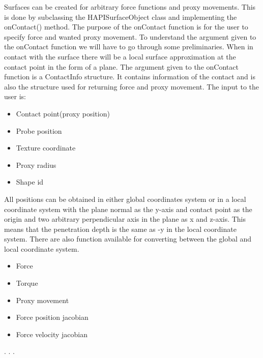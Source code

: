 Surfaces can be created for arbitrary force functions and proxy
movements. This is done by subclassing the HAPISurfaceObject class and
implementing the onContact() method. The purpose of the onContact
function is for the user to specify force and wanted proxy
movement. To understand the argument given to the onContact function
we will have to go through some preliminaries. When in contact with
the surface there will be a local surface approximation at the contact
point in the form of a plane. The argument given to the onContact
function is a ContactInfo structure. It contains information of the
contact and is also the structure used for returning force and proxy
movement. The input to the user is:


\begin{itemize}
\item Contact point(proxy position)
\item Probe position
\item Texture coordinate
\item Proxy radius
\item Shape id
\end{itemize}

All positions can be obtained in either global coordinates system or
in a local coordinate system with the plane normal as the y-axis and
contact point as the origin and two arbitrary perpendicular axis in
the plane as x and z-axis. This means that the penetration depth is
the same as -y in the local coordinate system. There are also function
available for converting between the global and local coordinate
system.

\begin{itemize}
\item Force
\item Torque
\item Proxy movement
\item Force position jacobian
\item Force velocity jacobian

\end{itemize}

.
.
.

